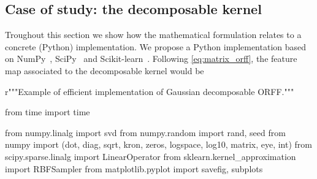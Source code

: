 \subsection{Case of study: the decomposable kernel}
\label{subsec:fast_decomposable}
Troughout this section we show how the mathematical formulation relates to a
concrete (Python) implementation. We propose a Python implementation based on
NumPy~\citep{oliphant2006guide}, SciPy~\citep{jones2014scipy} and
Scikit-learn~\citep{pedregosa2011scikit}. Following \cref{eq:matrix_orff}, the
feature map associated to the decomposable kernel would be
\begin{pycode}
r"""Example of efficient implementation of Gaussian decomposable ORFF."""

from time import time

from numpy.linalg import svd
from numpy.random import rand, seed
from numpy import (dot, diag, sqrt, kron, zeros,
                   logspace, log10, matrix, eye, int)
from scipy.sparse.linalg import LinearOperator
from sklearn.kernel_approximation import RBFSampler
from matplotlib.pyplot import savefig, subplots
\end{pycode}

